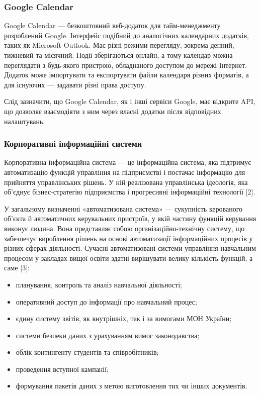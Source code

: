 \subsubsection{Google Calendar}
Google Calendar — безкоштовний веб-додаток для тайм-менеджменту розроблений Google. Інтерфейс подібний до аналогічних календарних додатків, таких як Microsoft Outlook. Має різні режими перегляду, зокрема денний, тижневий та місячний. Події зберігаються онлайн, а тому календар можна переглядати з будь-якого пристрою, обладнаного доступом до мережі Інтернет. Додаток може імпортувати та експортувати файли календаря різних форматів, а для існуючих — задавати різні права доступу. 

Слід зазначити, що Google Calendar, як і інші сервіси Google, має відкрите API, що дозволяє взаємодіяти з ним через власні додатки після відповідних налаштувань.

\subsubsection{Корпоративні інформаційні системи}
Корпоративна інформаційна система — це інформаційна система, яка підтримує автоматизацію функцій управління на підприємстві і постачає інформацію для прийняття управлінських рішень. У ній реалізована управлінська ідеологія, яка об'єднує бізнес-стратегію підприємства і прогресивні інформаційні технології [2].

У загальному визначенні «автоматизована система» — сукупність керованого об’єкта й автоматичних керувальних пристроїв, у якій частину функцій керування виконує людина. Вона представляє собою організаційно-технічну систему, що забезпечує вироблення рішень на основі автоматизації інформаційних процесів у різних сферах діяльності. Сучасні автоматизовані системи управління навчальним процесом у  закладах вищої освіти здатні вирішувати велику кількість функцій, а саме [3]:
\begin{itemize}
	\item планування, контроль та аналіз навчальної діяльності;
	\item оперативний доступ до інформації про навчальний процес;
	\item єдину систему звітів, як внутрішніх, так і за вимогами МОН України;
	\item системи безпеки даних з урахуванням вимог законодавства;
	\item облік контингенту студентів та співробітників;
	\item проведення вступної кампанії;
	\item формування пакетів даних з метою виготовлення тих чи інших документів.
\end{itemize}

